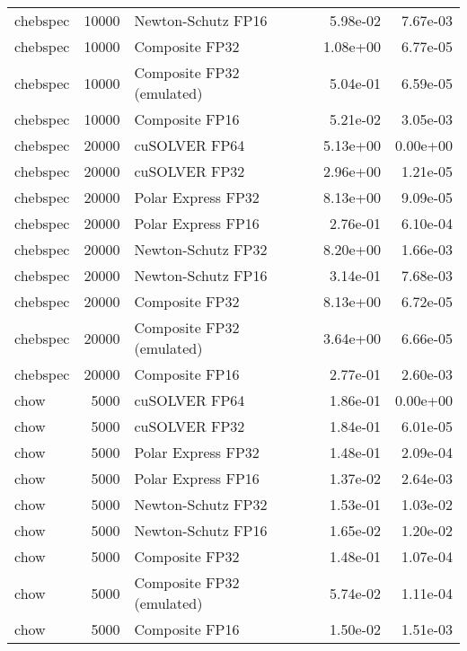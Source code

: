 \begin{table}
\begin{tabular}{lrlrr}
 chebspec & 10000 &        Newton-Schutz FP16 &  5.98e-02 &        7.67e-03 \\
 chebspec & 10000 &            Composite FP32 &  1.08e+00 &        6.77e-05 \\
 chebspec & 10000 & Composite FP32 (emulated) &  5.04e-01 &        6.59e-05 \\
 chebspec & 10000 &            Composite FP16 &  5.21e-02 &        3.05e-03 \\
 chebspec & 20000 &             cuSOLVER FP64 &  5.13e+00 &        0.00e+00 \\
 chebspec & 20000 &             cuSOLVER FP32 &  2.96e+00 &        1.21e-05 \\
 chebspec & 20000 &        Polar Express FP32 &  8.13e+00 &        9.09e-05 \\
 chebspec & 20000 &        Polar Express FP16 &  2.76e-01 &        6.10e-04 \\
 chebspec & 20000 &        Newton-Schutz FP32 &  8.20e+00 &        1.66e-03 \\
 chebspec & 20000 &        Newton-Schutz FP16 &  3.14e-01 &        7.68e-03 \\
 chebspec & 20000 &            Composite FP32 &  8.13e+00 &        6.72e-05 \\
 chebspec & 20000 & Composite FP32 (emulated) &  3.64e+00 &        6.66e-05 \\
 chebspec & 20000 &            Composite FP16 &  2.77e-01 &        2.60e-03 \\
     chow &  5000 &             cuSOLVER FP64 &  1.86e-01 &        0.00e+00 \\
     chow &  5000 &             cuSOLVER FP32 &  1.84e-01 &        6.01e-05 \\
     chow &  5000 &        Polar Express FP32 &  1.48e-01 &        2.09e-04 \\
     chow &  5000 &        Polar Express FP16 &  1.37e-02 &        2.64e-03 \\
     chow &  5000 &        Newton-Schutz FP32 &  1.53e-01 &        1.03e-02 \\
     chow &  5000 &        Newton-Schutz FP16 &  1.65e-02 &        1.20e-02 \\
     chow &  5000 &            Composite FP32 &  1.48e-01 &        1.07e-04 \\
     chow &  5000 & Composite FP32 (emulated) &  5.74e-02 &        1.11e-04 \\
     chow &  5000 &            Composite FP16 &  1.50e-02 &        1.51e-03 \\

\end{tabular}
\end{table}
